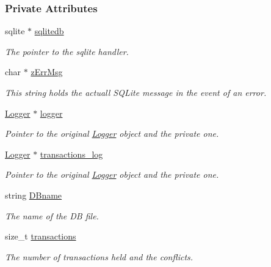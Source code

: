 \subsubsection*{Private Attributes}
\begin{CompactItemize}
\item 
sqlite $\ast$ \hyperlink{classSQLiteConnection_SQLiteConnectiono0}{sqlitedb}
\begin{CompactList}\small\item\em The pointer to the sqlite handler.\item\end{CompactList}\item 
char $\ast$ \hyperlink{classSQLiteConnection_SQLiteConnectiono1}{z\-Err\-Msg}
\begin{CompactList}\small\item\em This string holds the actuall SQLite message in the event of an error.\item\end{CompactList}\item 
\hyperlink{classLogger}{Logger} $\ast$ \hyperlink{classSQLiteConnection_SQLiteConnectiono2}{logger}
\begin{CompactList}\small\item\em Pointer to the original \hyperlink{classLogger}{Logger} object and the private one.\item\end{CompactList}\item 
\hyperlink{classLogger}{Logger} $\ast$ \hyperlink{classSQLiteConnection_SQLiteConnectiono3}{transactions\_\-log}
\begin{CompactList}\small\item\em Pointer to the original \hyperlink{classLogger}{Logger} object and the private one.\item\end{CompactList}\item 
string \hyperlink{classSQLiteConnection_SQLiteConnectiono4}{DBname}
\begin{CompactList}\small\item\em The name of the DB file.\item\end{CompactList}\item 
size\_\-t \hyperlink{classSQLiteConnection_SQLiteConnectiono5}{transactions}
\begin{CompactList}\small\item\em The number of transactions held and the conflicts.\item\end{CompactList}\item 

\end{CompactItemize}
